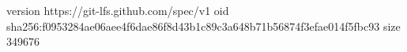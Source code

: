 version https://git-lfs.github.com/spec/v1
oid sha256:f0953284ae06aee4f6dae86f8d43b1c89c3a648b71b56874f3efae014f5fbc93
size 349676
